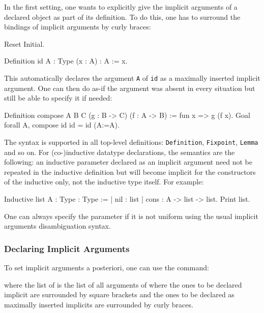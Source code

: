 In the first setting, one wants to explicitly give the implicit
arguments of a declared object as part of its definition. To do this, one has
to surround the bindings of implicit arguments by curly braces:
\begin{coq_eval}
Reset Initial.
\end{coq_eval}
\begin{coq_example}
Definition id {A : Type} (x : A) : A := x.
\end{coq_example}

This automatically declares the argument {\tt A} of {\tt id} as a
maximally inserted implicit argument. One can then do as-if the argument
was absent in every situation but still be able to specify it if needed:
\begin{coq_example}
Definition compose {A B C} (g : B -> C) (f : A -> B) := 
  fun x => g (f x).
Goal forall A, compose id id = id (A:=A).
\end{coq_example}

The syntax is supported in all top-level definitions: {\tt Definition},
{\tt Fixpoint}, {\tt Lemma} and so on. For (co-)inductive datatype
declarations, the semantics are the following: an inductive parameter
declared as an implicit argument need not be repeated in the inductive
definition but will become implicit for the constructors of the
inductive only, not the inductive type itself. For example:

\begin{coq_example}
Inductive list {A : Type} : Type :=
| nil : list
| cons : A -> list -> list.
Print list.
\end{coq_example}

One can always specify the parameter if it is not uniform using the
usual implicit arguments disambiguation syntax.

\subsubsection{Declaring Implicit Arguments}

To set implicit arguments a posteriori, one can use the
command:
\begin{quote}
{}
\end{quote}
where the list of {\possiblybracketedident} is the list of all arguments of
{\qualid} where the ones to be declared implicit are surrounded by
square brackets and the ones to be declared as maximally inserted implicits
are surrounded by curly braces.

